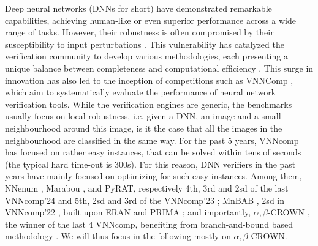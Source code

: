 Deep neural networks (DNNs for short) have demonstrated remarkable capabilities, achieving human-like or even superior performance across a wide range of tasks. However, their robustness is often compromised by their susceptibility to input perturbations \cite{szegedy}. This vulnerability has catalyzed the verification community to develop various methodologies, each presenting a unique balance between completeness and computational efficiency \cite{katz2019marabou,Reluplex,deeppoly}. This surge in innovation has also led to the inception of competitions such as VNNComp \cite{VNNcomp}, which aim to systematically evaluate the performance of neural network verification tools. While the verification engines are generic, the benchmarks usually focus on local robustness, i.e. given a DNN, an image and a small neighbourhood around this image, is it the case that all the images in the neighbourhood are classified in the same way. 
For the past 5 years, VNNcomp has focused on rather easy instances, that can be solved within tens of seconds (the typical hard time-out is 300s). For this reason, DNN verifiers in the past years have mainly focused on optimizing for such easy instances. Among them, NNenum \cite{nnenum}, Marabou \cite{Marabou, Marabou2}, and PyRAT, respectively 4th, 3rd and 2sd of the last VNNcomp'24 \cite{VNNcomp24}
and 5th, 2sd and 3rd  of the VNNcomp'23 \cite{VNNcomp23}; MnBAB \cite{ferrari2022complete}, 2sd in VNNcomp'22 \cite{VNNcomp22}, built upon ERAN \cite{deeppoly} and PRIMA \cite{prima}; and importantly, $\alpha,\beta$-CROWN \cite{crown,xu2020fast}, the winner of the last 4 VNNcomp, benefiting from branch-and-bound based methodology \cite{cutting,BaB}.
We will thus focus in the following mostly on $\alpha,\beta$-CROWN.

